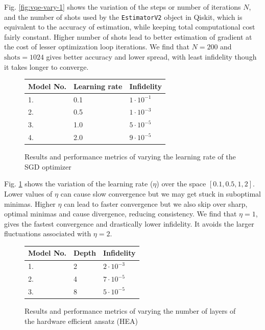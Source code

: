 \documentclass[11pt,a4paper]{article}
\begin{document}
Fig. \ref{fig:vqe-vary-1} shows the variation of the steps or number of iterations $N$, and the number of shots used by the \texttt{EstimatorV2} object in Qiskit, which is equivalent to the accuracy of estimation, while keeping total computational cost fairly constant. Higher number of shots lead to better estimation of gradient at the cost of lesser optimization loop iterations. We find that $N = 200$ and $\text{shots} = 1024$ gives better accuracy and lower spread, with least infidelity though it takes longer to converge.

\begin{figure}[H]
    \centering
    \small
    \begin{tabular}{@{}lll@{}}
        \toprule
        \textbf{Model No.}  & \textbf{Learning rate} & \textbf{Infidelity} \\ \midrule
        1. & 0.1 & $1 \cdot 10^{-1}$ \\
        2. & 0.5 & $1 \cdot 10^{-3}$ \\
        3. & 1.0 & $5 \cdot 10^{-5}$ \\
        4. & 2.0 & $9 \cdot 10^{-5}$ \\ \bottomrule
    \end{tabular}
    \caption{Results and performance metrics of varying the learning rate of the SGD optimizer}
    \label{fig:vqe-vary-2}
\end{figure}

Fig. \ref{fig:vqe-vary-2} shows the variation of the learning rate ($\eta$) over the space $[0.1, 0.5, 1, 2]$. Lower values of $\eta$ can cause slow convergence but we may get stuck in suboptimal minimas.  Higher $\eta$ can lead to faster convergence but we also skip over sharp, optimal minimas and cause divergence, reducing consistency. We find that $\eta = 1$, gives the fastest convergence and drastically lower infidelity. It avoids the larger fluctuations associated with $\eta = 2$.  

\begin{figure}[H]
    \centering
    \small
    \begin{tabular}{@{}lll@{}}
        \toprule
        \textbf{Model No.}  & \textbf{Depth} & \textbf{Infidelity} \\ \midrule
        1. & 2  & $2 \cdot 10^{-3}$ \\
        2. & 4  & $7 \cdot 10^{-5}$ \\
        3. & 8  & $5 \cdot 10^{-5}$ \\ \bottomrule
    \end{tabular}
    \caption{Results and performance metrics of varying the number of layers of the hardware efficient ansatz (HEA)}
    \label{fig:vqe-vary-3}
\end{figure}
\end{document}
